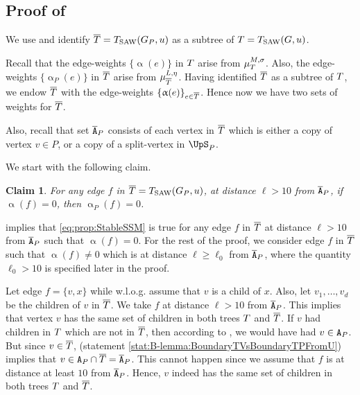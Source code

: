 \documentclass[11pt,reqno]{amsart}
\numberwithin{equation}{section}
\newtheorem{claim}[theorem]{Claim}
\newcommand{\applegreen}[1]{ {\color{applegreen}#1}}
\newcommand{\blue}[1]{{\color{blue}#1}}
\newcommand{\cadmiumorange}[1]{{\color{cadmiumorange}#1}}
\newcommand{\deeppink}[1]{{\color{deeppink}#1}}
\newcommand{\electricviolet}[1]{{\color{electricviolet}#1}}
\newcommand{\goldenbrown}[1]{{\color{goldenbrown}#1}}
\newcommand{\heliotrope}[1]{{\color{heliotrope}#1}}
\newcommand{\magenta}[1]{{\color{magenta}#1}}
\newcommand{\red}[1]{{\color{red}#1}}
\newcommand{\gratio}{{R}}
\newcommand{\Tsaw}{T_{\rm SAW}}
\renewcommand{\applegreen}[1]{#1}
\renewcommand{\blue}[1]{#1}
\renewcommand{\cadmiumorange}[1]{#1}
\renewcommand{\deeppink}[1]{#1}
\renewcommand{\electricviolet}[1]{#1}
\renewcommand{\goldenbrown}[1]{#1}
\renewcommand{\heliotrope}[1]{#1}
\renewcommand{\magenta}[1]{#1}
\renewcommand{\red}[1]{#1}
\newcommand{\ke}{\blue{e}}
\newcommand{\kf}{\deeppink{f}}
\newcommand{\kL}{\cadmiumorange{L}}
\newcommand{\kell}{{\color{green(pigment)}\ell}}%
\newcommand{\kP}{\goldenbrown{P}}
\newcommand{\ku}{\red{u}}
\newcommand{\kv}{\electricviolet{v}}
\newcommand{\kx}{\heliotrope{x}}
\renewcommand{\ke}{e}
\renewcommand{\kf}{f}
\renewcommand{\kL}{L}
\renewcommand{\kell}{\ell}
\renewcommand{\kP}{P}
\renewcommand{\ku}{u}
\renewcommand{\kv}{v}
\renewcommand{\kx}{x}
\newcommand{\infweight}{\upalpha}
\begin{document}
\newcommand{\ratioT}{\blue{\gratio}}
\newcommand{\ratioTP}{\magenta{\overline{\gratio}}}




\subsection{Proof of }\label{sec:prop:StableSSM}

We use  and identify $\SMTPu=\Tsaw(\gext{G}{\kP}, \ku)$ as a subtree of 
$\SMTu=\Tsaw(G,\ku)$.


Recall that the edge-weights $\{ \infweight(e)\}$ in $\SMTu$ arise from $\mu^{M,\sigma}_{\SMTu}$. Also, the
edge-weights   $\{\infweight_{\kP}(\ke)\}$ in $\overline{T}$ arise from $\mu^{\kL,\eta}_{\SMTPu}$. Having identified 
$\overline{T}$ as a subtree of $\SMTu$, we endow $\overline{T}$ with the edge-weights $\{ \infweight(\ke)\}_{\ke\in \SMTPu}$. 
 Hence now we have two sets of weights for $\overline{T}$. 


Also, recall that set $\cpTP$ consists of each vertex in $\overline{T}$ which is either a copy of vertex $\kv\in P$, or 
a copy of a split-vertex in $\ssplit_{\kP}$. %



We start with the following claim.
\begin{claim}\label{claim:AlphaPZero}
For any edge $\kf$ in $\SMTPu=\Tsaw(\gext{G}{\kP},\ku)$, at distance $\kell >10$ from $\cpTP$, 
 if $\infweight(\kf)=0$, then $\infweight_{\kP}(\kf)=0$. 
\end{claim}


 implies that \eqref{eq:prop:StableSSM} is true for any edge $\kf$ in $\overline{T}$ at 
distance $\kell>10$ from $\cpTP$  such that $\infweight(\kf)=0$. For the rest of the proof, we consider edge 
$\kf$ in $\overline{T}$ such that $\infweight(\kf)\neq 0$ which is at distance $\kell \geq \ell_0$ from $\cpTP$, where 
the quantity  $\ell_0>10$ is specified later in the proof. 





Let edge $\kf=\{\kv,\kx\}$ while w.l.o.g. assume that $\kv$ is a child of $\kx$. Also, let $\kv_1, \ldots, \kv_d$ 
be the children of  $\kv$ in $\overline{T}$. We take $\kf$ at distance $\kell>10$ from $\cpTP$. This implies that 
vertex $\kv$ has the same set of children in both trees $\SMTu$ and $\overline{T}$. If $\kv$ had children in 
$\SMTu$ which are not in $\overline{T}$, then according to , we would have had
$\kv\in \cpT$. But since $\kv\in \SMTPu$,  (statement 
\ref{stat:B-lemma:BoundaryTVsBoundaryTPFromU})  implies that $\kv\in \cpT\cap \SMTPu=\cpTP$.  
This cannot happen since we assume that $\kf$ is at distance at least $10$ from $\cpTP$.  Hence, $\kv$ 
indeed has the same set of children in both trees $\SMTu$ and $\overline{T}$.
\end{document}

